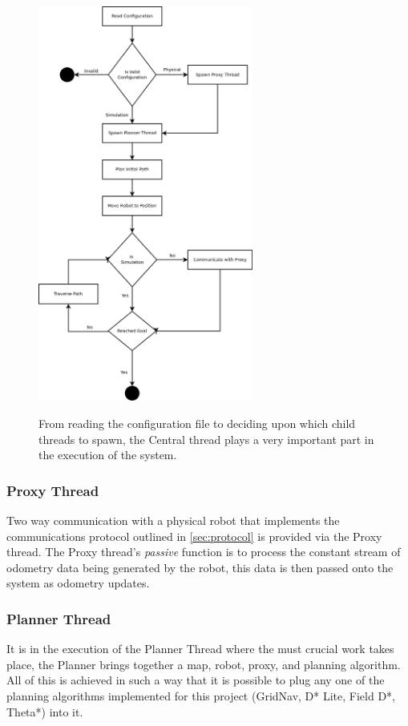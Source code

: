 \begin{figure}[htbp]

\center \includegraphics[width=200pt]{illustrations/thread_flow.png}\\
\caption{From reading the configuration file to deciding upon which child threads to spawn, the Central thread plays a very important part in the execution of the system.} 
\label{central thread}

\end{figure}

\subsubsection*{Proxy Thread}
\noindent
Two way communication with a physical robot that implements the communications protocol outlined in \ref{sec:protocol} is provided via the Proxy thread. The Proxy thread's \textit{passive} function is to process the constant stream of odometry data being generated by the robot, this data is then passed onto the system as odometry updates. 

\subsubsection*{Planner Thread}\label{planner thread}
\noindent
It is in the execution of the Planner Thread where the must crucial work takes place, the Planner brings together a map, robot, proxy, and planning algorithm. All of this is achieved in such a way that it is possible to plug any one of the planning algorithms implemented for this project (GridNav, D* Lite, Field D*, Theta*) into it. \\


